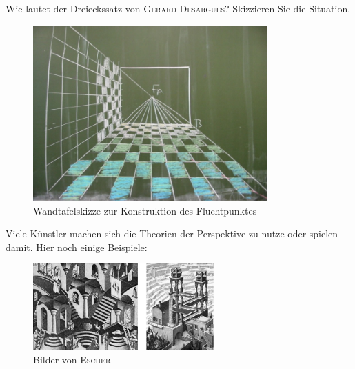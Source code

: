\documentclass[%
11pt,%
twoside,%
titlepage,%
german,%
headsepline%
]{scrartcl}
\begin{document}
\begin{ueb}
Wie lautet der Dreieckssatz von \textsc{Gerard Desargues}? Skizzieren Sie die Situation.
\end{ueb}

\begin{figure}[h!]
\begin{center}
\includegraphics[width=0.8\textwidth]{pictures/fluchtp}
\caption{Wandtafelskizze zur Konstruktion des Fluchtpunktes}
\end{center}
\end{figure}

Viele K\"unstler machen sich die Theorien der Perspektive zu nutze oder spielen damit. Hier noch einige Beispiele:

\begin{figure}[h!]
\begin{center}
\includegraphics[width=0.618\textwidth]{pictures/escher}
\caption{Bilder von \textsc{Escher}}
\end{center}
\end{figure}
\end{document}
